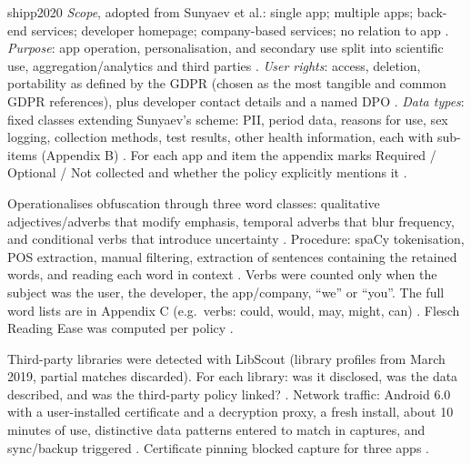 \begin{papercard}{shipp2020}
 \emph{Scope}, adopted from Sunyaev et al.: single app; multiple apps; back-end services; developer homepage; company-based services; no relation to app . \emph{Purpose}: app operation, personalisation, and secondary use split into scientific use, aggregation/analytics and third parties . \emph{User rights}: access, deletion, portability as defined by the GDPR (chosen as the most tangible and common GDPR references), plus developer contact details and a named DPO . \emph{Data types}: fixed classes extending Sunyaev's scheme: PII, period data, reasons for use, sex logging, collection methods, test results, other health information, each with sub-items (Appendix B) . For each app and item the appendix marks Required / Optional / Not collected and whether the policy explicitly mentions it .

 Operationalises obfuscation through three word classes: qualitative adjectives/adverbs that modify emphasis, temporal adverbs that blur frequency, and conditional verbs that introduce uncertainty . Procedure: spaCy tokenisation, POS extraction, manual filtering, extraction of sentences containing the retained words, and reading each word in context . Verbs were counted only when the subject was the user, the developer, the app/company, ``we'' or ``you''. The full word lists are in Appendix C (e.g.\ verbs: could, would, may, might, can) . Flesch Reading Ease was computed per policy .

 Third-party libraries were detected with LibScout (library profiles from March 2019, partial matches discarded). For each library: was it disclosed, was the data described, and was the third-party policy linked? . Network traffic: Android 6.0 with a user-installed certificate and a decryption proxy, a fresh install, about 10 minutes of use, distinctive data patterns entered to match in captures, and sync/backup triggered . Certificate pinning blocked capture for three apps .


\end{papercard}
